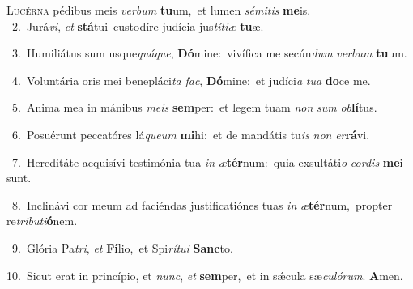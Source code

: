 \lettrine{\initial\textcolor{\initialcolor}{L}}{ucérna} pédibus meis \textit{ver}\-\textit{bum} \textbf{tu}\-um,~\star et lumen \textit{sé}\-\textit{mi}\textit{tis} \textbf{me}\-is.\\
{\numbfont\textcolor{\numbcolor}{~2.}}~Jurá\-\textit{vi}\-, \textit{et} \textbf{stá}\-tui~\star custodíre judícia jus\-\textit{tí}\-\textit{ti}\textit{æ} \textbf{tu}\-æ.\par
{\numbfont\textcolor{\numbcolor}{~3.}}~Humiliátus sum usque\-\textit{quá}\-\textit{que}, \textbf{Dó}\-mine:~\star vivífica me secún\textit{dum} \textit{ver}\-\textit{bum} \textbf{tu}\-um.\par
{\numbfont\textcolor{\numbcolor}{~4.}}~Voluntária oris mei benepláci\textit{ta} \textit{fac}\-, \textbf{Dó}\-mine:~\star et judíci\textit{a} \textit{tu}\-\textit{a} \textbf{do}\-ce me.\par
{\numbfont\textcolor{\numbcolor}{~5.}}~Anima mea in mánibus \textit{me}\-\textit{is} \textbf{sem}\-per:~\star et legem tuam \textit{non} \textit{sum} \textit{ob}\-\textbf{lí}tus.\par
{\numbfont\textcolor{\numbcolor}{~6.}}~Posuérunt peccatóres lá\-\textit{que}\-\textit{um} \textbf{mi}\-hi:~\star et de mandátis tu\textit{is} \textit{non} \textit{er}\-\textbf{rá}vi.\par
{\numbfont\textcolor{\numbcolor}{~7.}}~Hereditáte acquisívi testimónia tua \textit{in} \textit{æ}\-\textbf{tér}num:~\star quia exsultáti\textit{o} \textit{cor}\-\textit{dis} \textbf{me}\-i sunt.\par
{\numbfont\textcolor{\numbcolor}{~8.}}~Inclinávi cor meum ad faciéndas justificatiónes tuas \textit{in} \textit{æ}\-\textbf{tér}num,~\star propter re\-\textit{tri}\-\textit{bu}\textit{ti}\textbf{ó}nem.\par
{\numbfont\textcolor{\numbcolor}{~9.}}~Glória Pa\-\textit{tri}\-, \textit{et} \textbf{Fí}\-lio,~\star et Spi\-\textit{rí}\-\textit{tu}\textit{i} \textbf{Sanc}\-to.\par
{\numbfont\textcolor{\numbcolor}{10.}}~Sicut erat in princípio, et \textit{nunc}\-, \textit{et} \textbf{sem}\-per,~\star et in sǽcula sæ\-\textit{cu}\-\textit{ló}\textit{rum}. \textbf{A}\-men.\par
